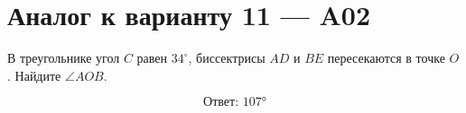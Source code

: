 


\section*{Аналог к варианту 11 — A02}
В треугольнике угол \(C\) равен \(34^\circ\), биссектрисы \(AD\) и \(BE\) пересекаются в точке \(O\). Найдите \(\angle AOB\).
\begin{center}\end{center}
\[\boxed{\text{Ответ: }107°}\]

